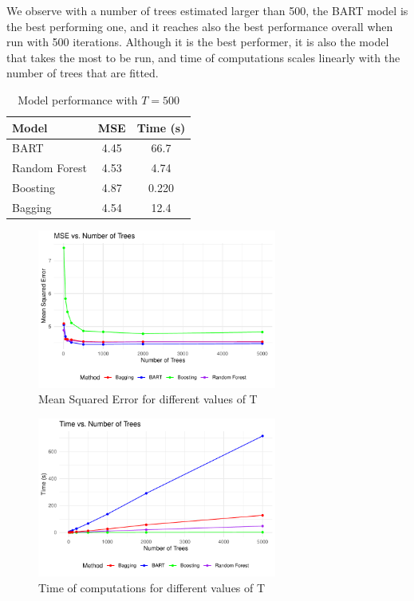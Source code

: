 \documentclass[a4paper,11pt]{article}
\begin{document}
We observe with a number of trees estimated larger than 500, the BART model is the best performing one, and it reaches also the best performance overall when run with 500 iterations. Although it is the best performer, it is also the model that takes the most to be run, and time of computations scales linearly with the number of trees that are fitted.

\begin{table}[ht]
  \centering
  \begin{tabular}{lcc}
  \toprule
  Model           & MSE & Time (s) \\
  \midrule
  BART            & 4.45    & 66.7  \\
  Random Forest   & 4.53    & 4.74  \\
  Boosting        & 4.87    & 0.220 \\
  Bagging         & 4.54    & 12.4  \\
  \bottomrule
  \end{tabular}
  \caption{Model performance with $T=500$}
  \end{table}


\begin{figure}
  \centering
  \includegraphics[width=0.7\textwidth]{../outputs/mse_plot.pdf}
  \caption{Mean Squared Error for different values of T}
  \label{plot_mse}
\end{figure}

\begin{figure}
  \centering
  \includegraphics[width=0.7\textwidth]{../outputs/time_plot.pdf}
  \caption{Time of computations for different values of T}
  \label{plot_time}
\end{figure}

\printbibliography
\end{document}
